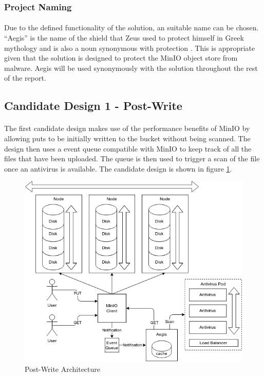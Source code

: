 \documentclass[12pt, conference, final, a4paper, onecolumn, compsoc]{IEEEtran}
\begin{document}
\subsubsection*{Project Naming}
\paragraph{}
Due to the defined functionality of the solution, an suitable name can be
chosen. ``Aegis'' is the name of the shield that Zeus used to protect himself in
Greek mythology and is also a noun synonymous with protection \citep{aegis}. This is
appropriate given that the solution is designed to protect the MinIO object
store from malware. Aegis will be used synonymously with the solution throughout
the rest of the report.

\subsection{Candidate Design 1 - Post-Write}
\paragraph{}

The first candidate design makes use of the performance benefits of MinIO by
allowing puts to be initially written to the bucket without being scanned. The
design then uses a event queue compatible with MinIO to keep track of all the
files that have been uploaded. The queue is then used to trigger a scan of the
file once an antivirus is available. The candidate design is shown in figure
\ref{fig:postWriteArch}.

\begin{figure}
  \includegraphics[scale=.4]{diagrams/post-write.png}
  \caption{Post-Write Architecture}
  \label{fig:postWriteArch}
\end{figure}
\end{document}
